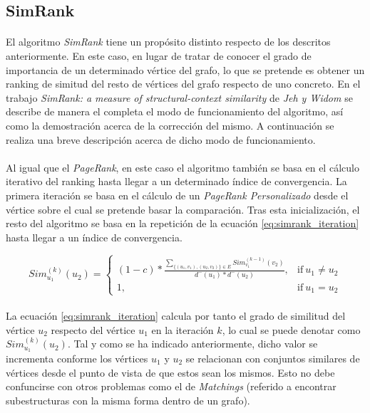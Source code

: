 \documentclass{subfiles}
\begin{document}
      \subsection{SimRank}
      \label{sec:simrank}

        \paragraph{}
        El algoritmo \emph{SimRank} tiene un propósito distinto respecto de los descritos anteriormente. En este caso, en lugar de tratar de conocer el grado de importancia de un determinado vértice del grafo, lo que se pretende es obtener un ranking de simitud del resto de vértices del grafo respecto de uno concreto. En el trabajo \emph{SimRank: a measure of structural-context similarity} \cite{jeh2002simrank} de \emph{Jeh y Widom} se describe de manera el completa el modo de funcionamiento del algoritmo, así como la demostración acerca de la corrección del mismo. A continuación se realiza una breve descripción acerca de dicho modo de funcionamiento.

        \paragraph{}
        Al igual que el \emph{PageRank}, en este caso el algoritmo también se basa en el cálculo iterativo del ranking hasta llegar a un determinado índice de convergencia. La primera iteración se basa en el cálculo de un \emph{PageRank Personalizado} desde el vértice sobre el cual se pretende basar la comparación. Tras esta inicialización, el resto del algoritmo se basa en la repetición de la ecuación \eqref{eq:simrank_iteration} hasta llegar a un índice de convergencia.

        \begin{equation}
        \label{eq:simrank_iteration}
          Sim^{(k)}_{u_1}({u_2}) =
          \begin{cases}
            (1-c) * \frac{\sum_{\{(u_1,v_1),(u_2,v_2)\} \in E} Sim^{(k-1)}_{v_1}({v_2})}{d^-({u_1})*d^-({u_2})}, & \text{if} \ u_1 \neq u_2 \\
            1, & \text{if} \ u_1 = u_2
          \end{cases}
        \end{equation}

        \paragraph{}
        La ecuación \eqref{eq:simrank_iteration} calcula por tanto el grado de similitud del vértice $u_2$ respecto del vértice $u_1$ en la iteración $k$, lo cual se puede denotar como $Sim^{(k)}_{u_1}({u_2})$. Tal y como se ha indicado anteriormente, dicho valor se incrementa conforme los vértices $u_1$ y $u_2$ se relacionan con conjuntos similares de vértices desde el punto de vista de que estos sean los mismos. Esto no debe confuncirse con otros problemas como el de \emph{Matchings} (referido a encontrar subestructuras con la misma forma dentro de un grafo).
\end{document}
